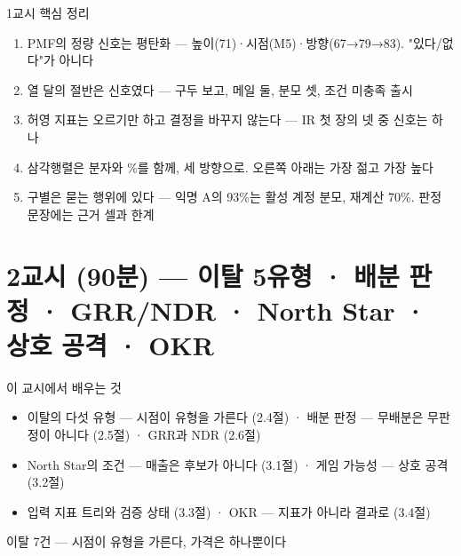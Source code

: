 \begin{frame}{1교시 핵심 정리}
\begin{enumerate}
\item PMF의 정량 신호는 평탄화 — 높이(71)·시점(M5)·방향(67→79→83). "있다/없다"가 아니다
\item 열 달의 절반은 신호였다 — 구두 보고, 메일 둘, 분모 셋, 조건 미충족 출시
\item 허영 지표는 오르기만 하고 결정을 바꾸지 않는다 — IR 첫 장의 넷 중 신호는 하나
\item 삼각행렬은 분자와 \%를 함께, 세 방향으로. 오른쪽 아래는 가장 젊고 가장 높다
\item 구별은 묻는 행위에 있다 — 익명 A의 93\%는 활성 계정 분모, 재계산 70\%. 판정 문장에는 근거 셀과 한계
\end{enumerate}
\end{frame}

\section{2교시 (90분) — 이탈 5유형 · 배분 판정 · GRR/NDR · North Star · 상호 공격 · OKR}
\begin{frame}{이 교시에서 배우는 것}
\begin{itemize}
\item 이탈의 다섯 유형 — 시점이 유형을 가른다 (2.4절) · 배분 판정 — 무배분은 무판정이 아니다 (2.5절) · GRR과 NDR (2.6절)
\item North Star의 조건 — 매출은 후보가 아니다 (3.1절) · 게임 가능성 — 상호 공격 (3.2절)
\item 입력 지표 트리와 검증 상태 (3.3절) · OKR — 지표가 아니라 결과로 (3.4절)
\end{itemize}
\end{frame}

\begin{frame}{이탈 7건 — 시점이 유형을 가른다, 가격은 하나뿐이다}
\end{frame}

